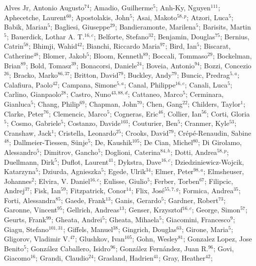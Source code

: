 Alves Jr, Antonio Augusto$^{74}$;
Amadio, Guilherme$^{5}$;
Anh-Ky, Nguyen$^{111}$;
Aphecetche, Laurent$^{60}$;
Apostolakis, John$^{5}$;
Asai, Makoto$^{58,p}$;
Atzori, Luca$^{5}$;
Babik, Marian$^{5}$;
Bagliesi, Giuseppe$^{29}$;
Bandieramonte, Marilena$^{5}$;
Barisits, Martin$^{5}$;
Bauerdick, Lothar A. T.$^{16,c}$;
Belforte, Stefano$^{32}$;
Benjamin, Douglas$^{75}$;
Bernius, Catrin$^{58}$;
Bhimji, Wahid$^{42}$;
Bianchi, Riccardo Maria$^{97}$;
Bird, Ian$^{5}$;
Biscarat, Catherine$^{48}$;
Blomer, Jakob$^{5}$;
Bloom, Kenneth$^{89}$;
Boccali, Tommaso$^{29}$;
Bockelman, Brian$^{89}$;
Bold, Tomasz$^{39}$;
Bonacorsi, Daniele$^{24}$;
Boveia, Antonio$^{94}$;
Bozzi, Concezio$^{26}$;
Bracko, Marko$^{86,37}$;
Britton, David$^{79}$;
Buckley, Andy$^{79}$;
Buncic, Predrag$^{5,a}$;
Calafiura, Paolo$^{42}$;
Campana, Simone$^{5,a}$;
Canal, Philippe$^{16,c}$;
Canali, Luca$^{5}$;
Carlino, Gianpaolo$^{28}$;
Castro, Nuno$^{43,88,d}$;
Cattaneo, Marco$^{5}$;
Cerminara, Gianluca$^{5}$;
Chang, Philip$^{69}$;
Chapman, John$^{70}$;
Chen, Gang$^{22}$;
Childers, Taylor$^{1}$;
Clarke, Peter$^{76}$;
Clemencic, Marco$^{5}$;
Cogneras, Eric$^{46}$;
Collier, Ian$^{56}$;
Corti, Gloria$^{5}$;
Cosmo, Gabriele$^{5}$;
Costanzo, Davide$^{103}$;
Couturier, Ben$^{5}$;
Cranmer, Kyle$^{53}$;
Cranshaw, Jack$^{1}$;
Cristella, Leonardo$^{25}$;
Crooks, David$^{79}$;
Crépé-Renaudin, Sabine$^{48}$;
Dallmeier-Tiessen, Sünje$^{5}$;
De, Kaushik$^{105}$;
De Cian, Michel$^{80}$;
Di Girolamo, Alessandro$^{5}$;
Dimitrov, Gancho$^{5}$;
Doglioni, Caterina$^{84,h}$;
Dotti, Andrea$^{58,p}$;
Duellmann, Dirk$^{5}$;
Duflot, Laurent$^{41}$;
Dykstra, Dave$^{16,c}$;
Dziedziniewicz-Wojcik, Katarzyna$^{5}$;
Dziurda, Agnieszka$^{5}$;
Egede, Ulrik$^{34}$;
Elmer, Peter$^{98,a}$;
Elmsheuser, Johannes$^{2}$;
Elvira, V. Daniel$^{16,c}$;
Eulisse, Giulio$^{5}$;
Ferber, Torben$^{67}$;
Filipcic, Andrej$^{37}$;
Fisk, Ian$^{59}$;
Fitzpatrick, Conor$^{14}$;
Flix, José$^{55,7,g}$;
Formica, Andrea$^{35}$;
Forti, Alessandra$^{85}$;
Gaede, Frank$^{13}$;
Ganis, Gerardo$^{5}$;
Gardner, Robert$^{73}$;
Garonne, Vincent$^{95}$;
Gellrich, Andreas$^{13}$;
Genser, Krzysztof$^{16,c}$;
George, Simon$^{57}$;
Geurts, Frank$^{99}$;
Gheata, Andrei$^{5}$;
Gheata, Mihaela$^{5}$;
Giacomini, Francesco$^{9}$;
Giagu, Stefano$^{101,31}$;
Giffels, Manuel$^{38}$;
Gingrich, Douglas$^{63}$;
Girone, Maria$^{5}$;
Gligorov, Vladimir V.$^{47}$;
Glushkov, Ivan$^{105}$;
Gohn, Wesley$^{81}$;
Gonzalez Lopez, Jose Benito$^{5}$;
González Caballero, Isidro$^{96}$;
González Fernández, Juan R.$^{96}$;
Govi, Giacomo$^{16}$;
Grandi, Claudio$^{24}$;
Grasland, Hadrien$^{41}$;
Gray, Heather$^{42}$;
